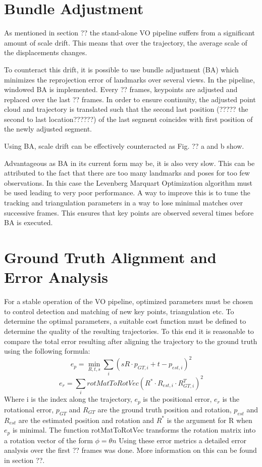\section{Bundle Adjustment}
\label{bundle adjustment}
As mentioned in section ?? the stand-alone VO pipeline suffers from a significant amount of scale drift. This means that over the trajectory, the average scale of the displacements changes. \par
To counteract this drift, it is possible to use bundle adjustment (BA) which minimizes the reprojection error of landmarks over several views. In the pipeline, windowed BA is implemented. Every ?? frames, keypoints are adjusted and replaced over the last ?? frames. In order to ensure continuity, the adjusted point cloud and trajectory is translated such that the second last position (????? the second to last location??????) of the last segment coincides with first position of the newly adjusted segment. \par
Using BA, scale drift can be effectively counteracted as Fig. ?? a and b show. \par
Advantageous as BA in its current form may be, it is also very slow. This can be attributed to the fact that there are too many landmarks and poses for too few observations. In this case the Levenberg Marquart Optimization algorithm must be used leading to very poor performance. A way to improve this is to tune the tracking and triangulation parameters in a way to lose minimal matches over successive frames. This ensures that key points are observed several times before BA is executed. 

\section{Ground Truth Alignment and Error Analysis}
\label{simulation}

For a stable operation of the VO pipeline, optimized parameters must be chosen to control detection and matching of new key points, triangulation etc. To determine the optimal parameters, a suitable cost function must be defined to determine the quality of the resulting trajectories. To this end it is reasonable to compare the total error resulting after aligning the trajectory to the ground truth using the following formula:
\begin{equation}e_p = \underset{R,t,s}{\min} \sum_i (sR \cdot p_{GT, i} + t - p_{est, i})^2\end{equation}
$$e_r = \sum_i rotMatToRotVec(R^* \cdot R_{est,i} \cdot R_{GT, i}^T)^2$$
Where i is the index along the trajectory, $e_p$ is the positional error, $e_r$ is the rotational error, $p_{GT}$ and $R_{GT}$ are the ground truth position and rotation, $p_{est}$ and $R_{est}$ are the estimated position and rotation and $R^*$ is the argument for R when $e_p$ is minimal. The function rotMatToRotVec transforms the rotation matrix into a rotation vector of the form $\phi = \theta n$  Using these error metrics a detailed error analysis over the first ?? frames was done. More information on this can be found in section ??.

